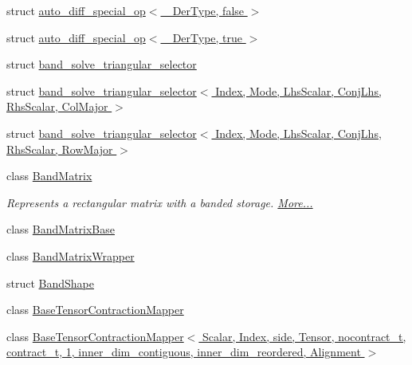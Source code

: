 \begin{DoxyCompactItemize}
struct \hyperlink{struct_eigen_1_1internal_1_1auto__diff__special__op_3_01___der_type_00_01false_01_4}{auto\+\_\+diff\+\_\+special\+\_\+op$<$ \+\_\+\+Der\+Type, false $>$}
\item 
struct \hyperlink{struct_eigen_1_1internal_1_1auto__diff__special__op_3_01___der_type_00_01true_01_4}{auto\+\_\+diff\+\_\+special\+\_\+op$<$ \+\_\+\+Der\+Type, true $>$}
\item 
struct \hyperlink{struct_eigen_1_1internal_1_1band__solve__triangular__selector}{band\+\_\+solve\+\_\+triangular\+\_\+selector}
\item 
struct \hyperlink{struct_eigen_1_1internal_1_1band__solve__triangular__selector_3_01_index_00_01_mode_00_01_lhs_sc55928e6c4094ec753b4bf039aa77c921}{band\+\_\+solve\+\_\+triangular\+\_\+selector$<$ Index, Mode, Lhs\+Scalar, Conj\+Lhs, Rhs\+Scalar, Col\+Major $>$}
\item 
struct \hyperlink{struct_eigen_1_1internal_1_1band__solve__triangular__selector_3_01_index_00_01_mode_00_01_lhs_scb3f84b84f0cb728030fb1bbaaacae5f9}{band\+\_\+solve\+\_\+triangular\+\_\+selector$<$ Index, Mode, Lhs\+Scalar, Conj\+Lhs, Rhs\+Scalar, Row\+Major $>$}
\item 
class \hyperlink{group___core___module_class_eigen_1_1internal_1_1_band_matrix}{Band\+Matrix}
\begin{DoxyCompactList}\small\item\em Represents a rectangular matrix with a banded storage.  \hyperlink{group___core___module_class_eigen_1_1internal_1_1_band_matrix}{More...}\end{DoxyCompactList}\item 
class \hyperlink{class_eigen_1_1internal_1_1_band_matrix_base}{Band\+Matrix\+Base}
\item 
class \hyperlink{class_eigen_1_1internal_1_1_band_matrix_wrapper}{Band\+Matrix\+Wrapper}
\item 
struct \hyperlink{struct_eigen_1_1internal_1_1_band_shape}{Band\+Shape}
\item 
class \hyperlink{class_eigen_1_1internal_1_1_base_tensor_contraction_mapper}{Base\+Tensor\+Contraction\+Mapper}
\item 
class \hyperlink{class_eigen_1_1internal_1_1_base_tensor_contraction_mapper_3_01_scalar_00_01_index_00_01side_00_080d560a1738baff9d26ac7a1ec9763b}{Base\+Tensor\+Contraction\+Mapper$<$ Scalar, Index, side, Tensor, nocontract\+\_\+t, contract\+\_\+t, 1, inner\+\_\+dim\+\_\+contiguous, inner\+\_\+dim\+\_\+reordered, Alignment $>$}
\item 

\end{DoxyCompactItemize}
